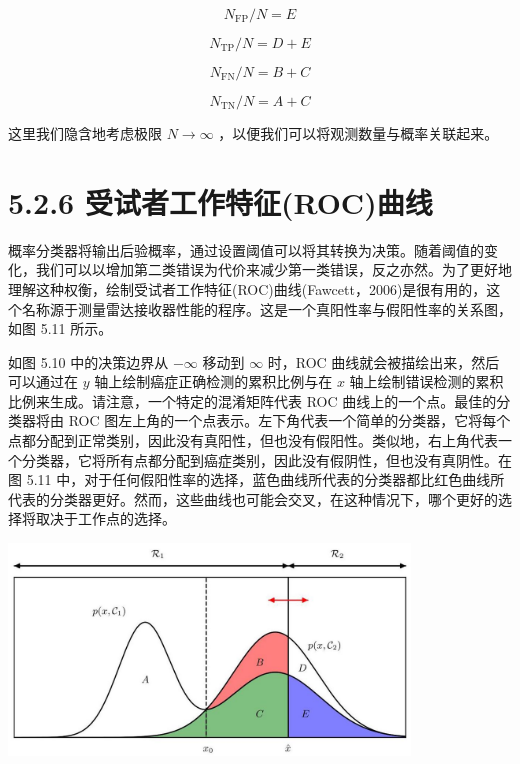 \documentclass[10pt]{report}
\begin{document}
\[
{N}_{\mathrm{{FP}}}/N = E \tag{5.34}
\]

\[
{N}_{\mathrm{{TP}}}/N = D + E \tag{5.35}
\]

\[
{N}_{\mathrm{{FN}}}/N = B + C \tag{5.36}
\]

\[
{N}_{\mathrm{{TN}}}/N = A + C \tag{5.37}
\]

这里我们隐含地考虑极限 \(N \rightarrow  \infty\) ，以便我们可以将观测数量与概率关联起来。

\section*{5.2.6 受试者工作特征(ROC)曲线}

概率分类器将输出后验概率，通过设置阈值可以将其转换为决策。随着阈值的变化，我们可以以增加第二类错误为代价来减少第一类错误，反之亦然。为了更好地理解这种权衡，绘制受试者工作特征(ROC)曲线(Fawcett，2006)是很有用的，这个名称源于测量雷达接收器性能的程序。这是一个真阳性率与假阳性率的关系图，如图 5.11 所示。

如图 5.10 中的决策边界从 \(- \infty\) 移动到 \(\infty\) 时，ROC 曲线就会被描绘出来，然后可以通过在 \(y\) 轴上绘制癌症正确检测的累积比例与在 \(x\) 轴上绘制错误检测的累积比例来生成。请注意，一个特定的混淆矩阵代表 ROC 曲线上的一个点。最佳的分类器将由 ROC 图左上角的一个点表示。左下角代表一个简单的分类器，它将每个点都分配到正常类别，因此没有真阳性，但也没有假阳性。类似地，右上角代表一个分类器，它将所有点都分配到癌症类别，因此没有假阴性，但也没有真阴性。在图 5.11 中，对于任何假阳性率的选择，蓝色曲线所代表的分类器都比红色曲线所代表的分类器更好。然而，这些曲线也可能会交叉，在这种情况下，哪个更好的选择将取决于工作点的选择。

\begin{center}
\includegraphics[max width=0.8\textwidth]{images/0194e279-9b28-703a-88f4-c3ac21e2010d_168_348_341_1099_580_0.jpg}
\end{center}
\hspace*{3em} 
\end{document}
